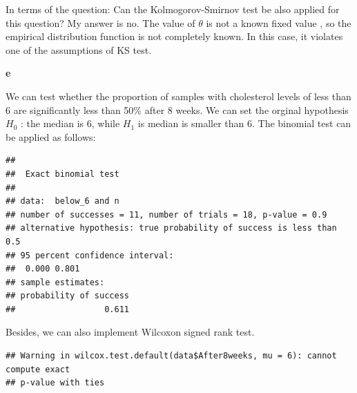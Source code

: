 \documentclass[
]{article}
\newenvironment{Shaded}{\begin{snugshade}}{\end{snugshade}}
\newcommand{\AttributeTok}[1]{\textcolor[rgb]{0.13,0.29,0.53}{#1}}
\newcommand{\DecValTok}[1]{\textcolor[rgb]{0.00,0.00,0.81}{#1}}
\newcommand{\FloatTok}[1]{\textcolor[rgb]{0.00,0.00,0.81}{#1}}
\newcommand{\FunctionTok}[1]{\textcolor[rgb]{0.13,0.29,0.53}{\textbf{#1}}}
\newcommand{\NormalTok}[1]{#1}
\newcommand{\OtherTok}[1]{\textcolor[rgb]{0.56,0.35,0.01}{#1}}
\newcommand{\SpecialCharTok}[1]{\textcolor[rgb]{0.81,0.36,0.00}{\textbf{#1}}}
\newcommand{\StringTok}[1]{\textcolor[rgb]{0.31,0.60,0.02}{#1}}
\begin{document}
In terms of the question: Can the Kolmogorov-Smirnov test be also
applied for this question? My answer is no. The value of \(\theta\) is
not a known fixed value , so the empirical distribution function is not
completely known. In this case, it violates one of the assumptions of KS
test.

\textbf{e}

We can test whether the proportion of samples with cholesterol levels of
less than 6 are significantly less than 50\% after 8 weeks. We can set
the orginal hypothesis \(H_0\) : the median is 6, while \(H_1\) is
median is smaller than 6. The binomial test can be applied as follows:

\begin{Shaded}
\end{Shaded}

\begin{verbatim}
## 
##  Exact binomial test
## 
## data:  below_6 and n
## number of successes = 11, number of trials = 18, p-value = 0.9
## alternative hypothesis: true probability of success is less than 0.5
## 95 percent confidence interval:
##  0.000 0.801
## sample estimates:
## probability of success 
##                  0.611
\end{verbatim}

Besides, we can also implement Wilcoxon signed rank test.

\begin{Shaded}
\end{Shaded}

\begin{verbatim}
## Warning in wilcox.test.default(data$After8weeks, mu = 6): cannot compute exact
## p-value with ties
\end{verbatim}
\end{document}
